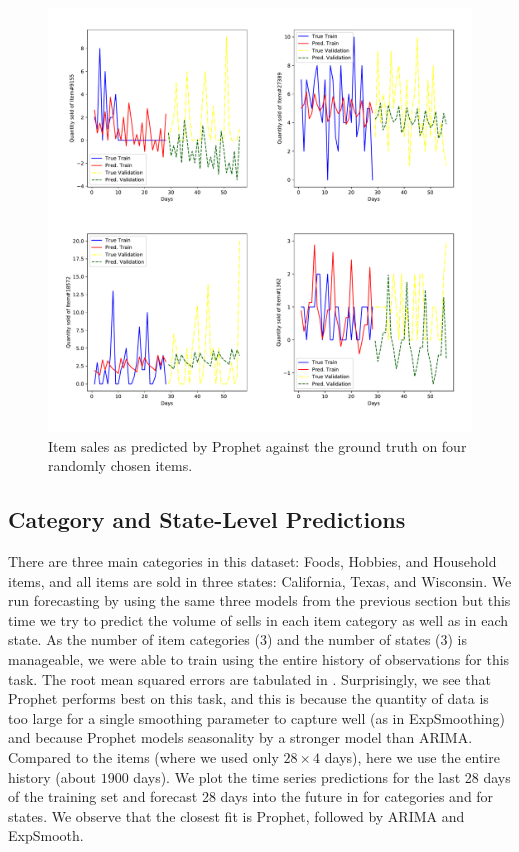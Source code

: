 \documentclass[12pt]{article}
\begin{document}
\begin{figure}[H]
  \centering
  \includegraphics[width=.8\linewidth]{prophet-items}
  \caption{Item sales as predicted by Prophet against the ground truth on four randomly chosen items.}
  \label{fig:pro-item-sales}
\end{figure}

\subsection{Category and State-Level Predictions}
There are three main categories in this dataset: Foods, Hobbies, and Household items, and all items are sold in three states: California, Texas, and Wisconsin. We run forecasting by using the same three models from the previous section but this time we try to predict the volume of sells in each item category as well as in each state. As the number of item categories ($3$) and the number of states ($3$) is manageable, we were able to train using the entire history of observations for this task. The root mean squared errors are tabulated in . Surprisingly, we see that Prophet performs best on this task, and this is because the quantity of data is too large for a single smoothing parameter to capture well (as in ExpSmoothing) and because Prophet models seasonality by a stronger model than ARIMA. Compared to the items (where we used only $28 \times 4$ days), here we use the entire history (about $1900$ days). We plot the time series predictions for the last 28 days of the training set and forecast 28 days into the future in  for categories and  for states. We observe that the closest fit is Prophet, followed by ARIMA and ExpSmooth.
\end{document}
